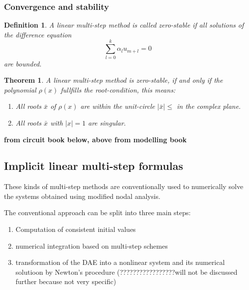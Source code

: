 \documentclass[11pt,titlepage]{article}
\newtheorem{definition}{Definition}
\newtheorem{theorem}{Theorem}
\begin{document}
			
			\subsubsection{Convergence and stability}
			
				\begin{definition}
					A linear multi-step method is called \emph{zero-stable} if all solutions of the difference equation
					\begin{displaymath}
						\sum_{l=0}^{k} \alpha_l u_{m+l} = 0
					\end{displaymath}
					are bounded.
				\end{definition}
			
				\begin{theorem}
					A linear multi-step method is zero-stable, if and only if the polynomial $\rho(x)$ fullfills the root-condition, this means:
					\begin{enumerate}
						\item All roots $\bar{x}$ of $\rho(x)$ are within the unit-circle $|\bar{x}| \leq$ in the complex plane.
						\item All roots $\bar{x}$ with $|x| = 1$ are singular.
					\end{enumerate}
				\end{theorem}

		
			\textbf{from circuit book below, above from modelling book}
		
			\subsection{Implicit linear multi-step formulas}
				These kinds of multi-step methods are conventionally used to numerically solve the systems obtained using modified nodal analysis. 
				
				The conventional approach can be split into three main steps:
				\begin{enumerate}
					\item Computation of consistent initial values
					\item numerical integration based on multi-step schemes
					\item transformation of the DAE into a nonlinear system and its numerical solutioon by Newton's procedure (?????????????????will not be discussed further because not very specific)
				\end{enumerate}
			
\end{document}
